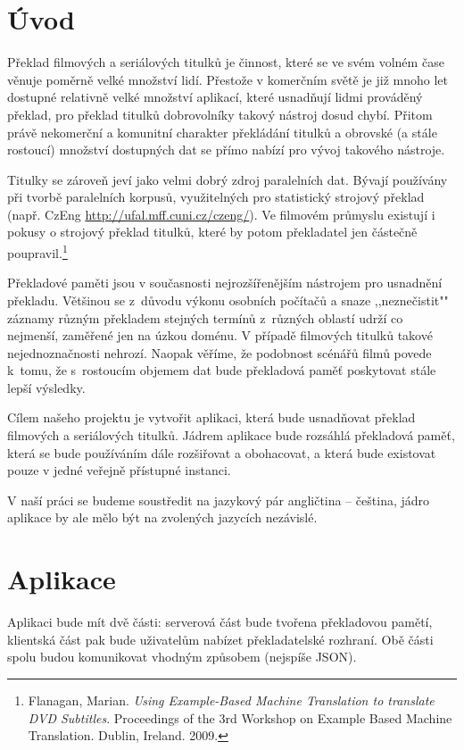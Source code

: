 \section{Úvod}

Překlad filmových a seriálových titulků je činnost, které se ve svém volném čase věnuje poměrně velké množství lidí. Přestože v komerčním světě je již mnoho let dostupné relativně velké množství aplikací, které usnadňují lidmi prováděný překlad, pro překlad titulků dobrovolníky takový nástroj dosud chybí. Přitom právě nekomerční a komunitní charakter překládání titulků a obrovské (a stále rostoucí) množství dostupných dat se přímo nabízí pro vývoj takového nástroje.

Titulky se zároveň jeví jako velmi dobrý zdroj paralelních dat. Bývají používány při tvorbě paralelních korpusů, využitelných pro statistický strojový překlad (např. CzEng \url{http://ufal.mff.cuni.cz/czeng/}). Ve filmovém průmyslu existují i pokusy o strojový překlad titulků, které by potom překladatel jen částečně poupravil.\footnote{Flanagan, Marian. \emph{Using Example-Based Machine Translation to translate DVD Subtitles}. Proceedings of the 3rd Workshop on Example Based Machine Translation. Dublin, Ireland. 2009.}

Překladové paměti jsou v současnosti nejrozšířenějším nástrojem pro usnadnění překladu. Většinou se z~důvodu výkonu osobních počítačů a snaze ,,neznečistit"" záznamy různým překladem stejných termínů z~různých oblastí udrží co nejmenší, zaměřené jen na úzkou doménu. V případě filmových titulků takové nejednoznačnosti nehrozí. Naopak věříme, že podobnost scénářů filmů povede k~tomu, že s~rostoucím objemem dat bude překladová paměť poskytovat stále lepší výsledky.

Cílem našeho projektu je vytvořit aplikaci, která bude usnadňovat překlad filmových a se\-ri\-á\-lo\-vých titulků. Jádrem aplikace bude rozsáhlá překladová paměť, která se bude používáním dále rozšiřovat a obohacovat, a která bude existovat pouze v jedné veřejně přístupné instanci.

V naší práci se budeme soustředit na jazykový pár angličtina – čeština, jádro aplikace by ale mělo být na zvolených jazycích nezávislé.

\section{Aplikace}
Aplikaci bude mít dvě části: serverová část bude tvořena překladovou pamětí, klientská část pak bude uživatelům nabízet překladatelské rozhraní. Obě části spolu budou komunikovat vhodným způsobem (nejspíše JSON).

